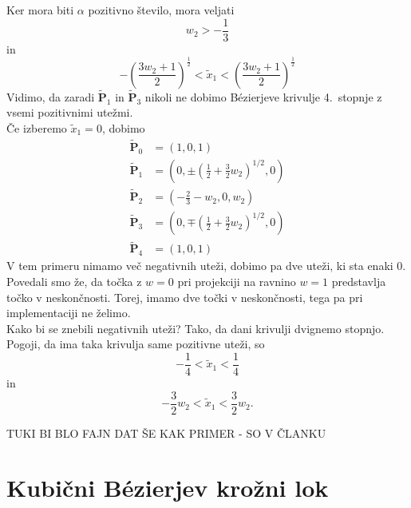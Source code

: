 \documentclass[a4paper,11pt]{article}
\theoremstyle{definition}
\theoremstyle{plain}
\begin{document}
Ker mora biti $\alpha$ pozitivno število, mora veljati
$$w_2>-\frac{1}{3}$$
in
$$-\left(\frac{3w_2+1}{2}\right)^{\frac{1}{2}}<\tilde{x}_1<\left(\frac{3w_2+1}{2}\right)^{\frac{1}{2}}$$
Vidimo, da zaradi $\boldsymbol{\tilde{P}}_1$ in $\boldsymbol{\tilde{P}}_3$ nikoli ne dobimo B\'ezierjeve krivulje 4.~stopnje z vsemi pozitivnimi utežmi. \\
Če izberemo $\tilde{x}_1=0$, dobimo  
\begin{align*}
\boldsymbol{\tilde{P}}_0 &= (1,0,1) \\
\boldsymbol{\tilde{P}}_1 &= (0,\pm (\frac{1}{2}+\frac{3}{2}w_2)^{1/2},0) \\
\boldsymbol{\tilde{P}}_2 &= (-\frac{2}{3}-w_2,0,w_2) \\
\boldsymbol{\tilde{P}}_3 &= (0,\mp(\frac{1}{2}+\frac{3}{2}w_2)^{1/2},0) \\
\boldsymbol{\tilde{P}}_4 &= (1,0,1)
\end{align*}
V tem primeru nimamo več negativnih uteži, dobimo pa dve uteži, ki sta enaki $0$. Povedali smo že, da točka z $w=0$ pri projekciji na ravnino $w=1$ predstavlja točko v neskončnosti. Torej, imamo dve točki v neskončnosti, tega pa pri implementaciji ne želimo. \\
Kako bi se znebili negativnih uteži? Tako, da dani krivulji dvignemo stopnjo. \\%
Pogoji, da ima taka krivulja same pozitivne uteži, so
$$-\frac{1}{4}<\tilde{x}_1<\frac{1}{4}$$
in
$$-\frac{3}{2}w_2<\tilde{x}_1<\frac{3}{2}w_2.$$

TUKI BI BLO FAJN DAT ŠE KAK PRIMER - SO V ČLANKU


\section{Kubični B\'ezierjev krožni lok}
\end{document}
